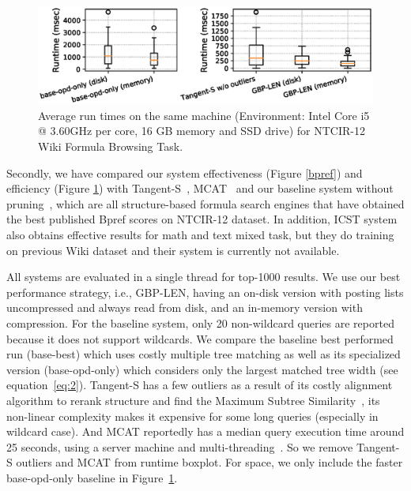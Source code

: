 \documentclass[runningheads]{llncs}
\begin{document}
\begin{figure}[!t]
\begin{center}
\hspace*{-0.1in}

\includegraphics[width=\textwidth]{fig/boxplot.eps}
\vspace{-0.25in}

\caption{Average run times on the same machine (Environment: Intel Core i5 @ 3.60GHz per core, 16 GB memory and SSD drive) for NTCIR-12 Wiki Formula Browsing Task.}
\label{boxplot}
\end{center}

\end{figure}

Secondly, we have compared our system effectiveness (Figure \ref{bpref}) and efficiency (Figure \ref{boxplot}) with Tangent-S~\cite{tangent-combine2017}, MCAT~\cite{mcat_16} and our baseline system without pruning~\cite{a0_2019},
which are all structure-based formula search engines  that have obtained the best published Bpref scores on NTCIR-12 dataset.
In addition, ICST system~\cite{peking2016} also obtains effective results for math and text mixed task, but they do training on previous Wiki dataset and their system is currently not available.

All systems are evaluated in a single thread for top-1000 results.
%
We use our best performance strategy, i.e., GBP-LEN, having an on-disk version with posting lists uncompressed and always read from disk, and an in-memory version with compression.
%
For the baseline system, only 20 non-wildcard queries are reported because it does not support wildcards. 
We compare the baseline best performed run (base-best) which uses costly multiple tree matching as well as its specialized version (base-opd-only) which considers only the largest matched tree width (see equation~\ref{eq:2}).
%
Tangent-S has a few outliers as a result of its costly alignment algorithm to rerank structure and find the Maximum Subtree Similarity~\cite{tangent-multistage2016}, its non-linear complexity makes it expensive for some long queries (especially in wildcard case).
%
And MCAT reportedly has a median query execution time around 25 seconds, using a server machine and multi-threading~\cite{mcat_16}.
So we remove Tangent-S outliers and MCAT from runtime boxplot.
For space, we only include the faster base-opd-only baseline in Figure~\ref{boxplot}.
\end{document}
